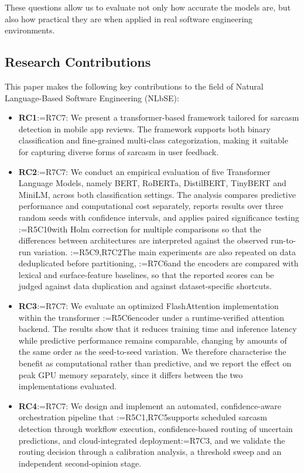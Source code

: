 \documentclass[a4paper,fleqn]{cas-sc}
\makeatletter
\newif\iftracked
\newcommand{\rv@setcolour}[1]{%
  \IfStrEq{#1}{R7C7}{\color{rvEdit}}{%
    \IfSubStr{#1}{R5}{\IfSubStr{#1}{R7}{\color{rvBoth}}{\color{rvFive}}}{\color{rvSeven}}}}
\newcommand{\rv@tag}[1]{\textsuperscript{\sffamily\bfseries\scriptsize[\StrSubstitute{#1}{,}{, }]}\,}
\newcommand{\rv@recordone}[1]{%
  \edef\rv@i{#1}%
  \ifcsdef{rv@n@\rv@i}{}{\csgdef{rv@n@\rv@i}{0}}%
  \csxdef{rv@n@\rv@i}{\the\numexpr\csuse{rv@n@\rv@i}+1\relax}%
  \begingroup\edef\@currentlabel{\rv@i}\label{rv:\rv@i:\csuse{rv@n@\rv@i}}\endgroup}
\newcommand{\rv@record}[1]{\@for\rv@id:=#1\do{\expandafter\rv@recordone\expandafter{\rv@id}}}
\DeclareRobustCommand{\rc}[2]{\rv@record{#1}\iftracked{\rv@setcolour{#1}\rv@tag{#1}#2}\else#2\fi}
\DeclareRobustCommand{\rcrep}[3]{\rv@record{#1}\iftracked{\rv@setcolour{#1}\rv@tag{#1}\rv@strike{#2} #3}\else#3\fi}
\DeclareRobustCommand{\rce}[1]{\rv@record{R7C7}\iftracked{\color{rvEdit}#1}\else#1\fi}
\makeatother
\begin{document}
These questions allow us to evaluate not only how accurate the models are, but also how practical they are when applied in real software engineering environments.

\subsection{Research Contributions}
This paper makes the following key contributions to the field of Natural Language-Based Software Engineering (NLbSE):
\begin{itemize}
\item \textbf{RC1}\rce{:} We present a transformer-based framework tailored for sarcasm detection in mobile app reviews. The framework supports both binary classification and fine-grained multi-class categorization, making it suitable for capturing diverse forms of sarcasm in user feedback.
\item \textbf{RC2}\rce{:} We conduct an empirical evaluation of five Transformer Language Models, namely BERT, RoBERTa, DistilBERT, TinyBERT and MiniLM, across both classification settings. The analysis compares predictive performance and computational cost separately, reports results over three random seeds with confidence intervals, and applies paired significance testing \rc{R5C10}{with Holm correction for multiple comparisons} so that the differences between architectures are interpreted against the observed run-to-run variation. \rc{R5C9,R7C2}{The main experiments are also repeated on data deduplicated before partitioning,} \rc{R7C6}{and the encoders are compared with lexical and surface-feature baselines, so that the reported scores can be judged against data duplication and against dataset-specific shortcuts.}
\item \textbf{RC3}\rce{:} We evaluate an optimized FlashAttention implementation within the transformer \rcrep{R5C6}{pipeline}{encoder} under a runtime-verified attention backend. The results show that it reduces training time and inference latency while predictive performance remains comparable, changing by amounts of the same order as the seed-to-seed variation. We therefore characterise the benefit as computational rather than predictive, and we report the effect on peak GPU memory separately, since it differs between the two implementations evaluated.
\item \textbf{RC4}\rce{:} We design and implement an automated, confidence-aware orchestration pipeline that \rcrep{R5C1,R7C5}{enables continuous sarcasm detection through scheduled workflow execution}{supports scheduled sarcasm detection through workflow execution}, confidence-based routing of uncertain predictions, and cloud-integrated deployment\rc{R7C3}{, and we validate the routing decision through a calibration analysis, a threshold sweep and an independent second-opinion stage}.

\end{itemize}
\end{document}
